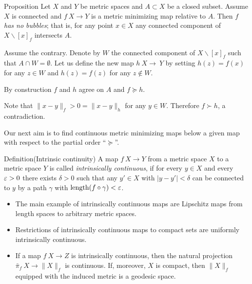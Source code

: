 \documentclass{article}
\begin{document}


\begin{thm}{Proposition}\label{prop:point-complement}
Let $X$ and $Y$ be metric spaces and $A\subset X$ be a closed subset.
Assume $X$ is connected and $f\:X\to Y$ is a metric minimizing map relative to $A$.
Then $f$ \label{page:no-bubble}\emph{has no bubbles}; that is, for any point $x\in X$ any connected component of $X\backslash [x]_f$ intersects $A$.

\end{thm}

Assume the contrary.
Denote by $W$ the connected component of $X\backslash [x]_f$ such that $A\cap W=\emptyset$.
Let us define the new map $h\:X\to\ Y$ by setting $h(z)=f(x)$ for any $z\in W$ and $h(z)=f(z)$ for any $z\notin W$.

By construction $f$ and $h$ agree on $A$ and $f\succcurlyeq h$.

Note that $\|x-y\|_f>0=\|x-y\|_h$ for any $y\in W$.
Therefore $f\succ h$, a contradiction.
\qeds

Our next aim is to 
find continuous metric minimizing maps below a given map with respect to the partial order ``$\succcurlyeq$''.

\begin{thm}{Definition}(Intrinsic continuity)
A map $f\:X\to Y$ from a metric space $X$ to a metric space
 $Y$ is called
{\em intrinsically continuous}, if for every $y\in X$ 
and every $\varepsilon>0$ there
exists $\delta>0$ such that any  $y'\in X$
with $|y-y'|<\delta$ can be connected to $y$ by a path $\gamma$ 
with $\mathop{\rm length}\nolimits(f\circ\gamma)<\varepsilon$.
\end{thm}

\begin{itemize}
 \item The main example of intrinsically continuous maps are Lipschitz
maps from length spaces to arbitrary metric spaces.
\item Restrictions of intrinsically continuous maps to compact sets are uniformly intrinsically continuous. %
\item If a map $f\:X\to Z$ is intrinsically continuous, then 
the natural projection $\bar\pi_f\:X\rightarrow \|X\|_f$ is continuous. 
If, moreover, $X$ is compact, then $\|X\|_f$ equipped with the induced 
metric is a geodesic space.
\end{itemize}
\end{document}
